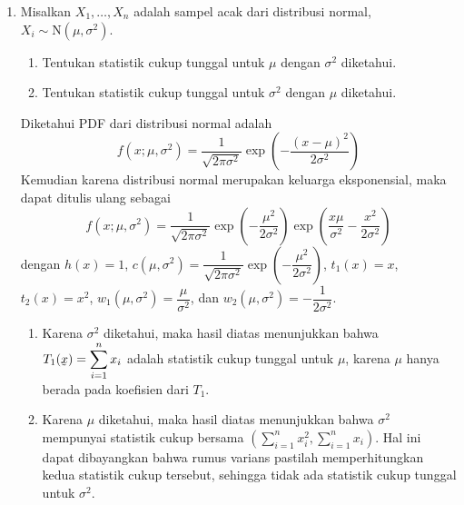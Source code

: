 \documentclass{exam}
\begin{document}
\begin{enumerate}
    \item Misalkan \(X_1, \dots, X_n\) adalah sampel acak dari distribusi normal, \(X_i \sim \text{N}(\mu, \sigma^2)\).
    \begin{enumerate}
        \item Tentukan statistik cukup tunggal untuk \(\mu\) dengan \(\sigma^2\) diketahui.
        \item Tentukan statistik cukup tunggal untuk \(\sigma^2\) dengan \(\mu\) diketahui.
    \end{enumerate}
    \begin{solution}
        Diketahui PDF dari distribusi normal adalah
        \begin{equation*}
            f(x;\mu,\sigma^2) = \frac{1}{\sqrt{2\pi\sigma^2}}\exp\left(-\frac{(x-\mu)^2}{2\sigma^2}\right)
        \end{equation*}
        Kemudian karena distribusi normal merupakan keluarga eksponensial, maka dapat ditulis ulang sebagai
        \begin{equation*}
            f(x;\mu,\sigma^2) = \frac{1}{\sqrt{2\pi\sigma^2}}\exp\left(-\frac{\mu^2}{2\sigma^2}\right)\exp\left(\frac{x\mu}{\sigma^2}-\frac{x^2}{2\sigma^2}\right)
        \end{equation*}
        dengan $h(x)=1$, $c(\mu,\sigma^2)=\dfrac{1}{\sqrt{2\pi\sigma^2}}\exp\left(-\dfrac{\mu^2}{2\sigma^2}\right)$, $t_1(x)=x$, $t_2(x)=x^2$, $w_1(\mu,\sigma^2)=\dfrac{\mu}{\sigma^2}$, dan $w_2(\mu,\sigma^2)=-\dfrac{1}{2\sigma^2}$.
        \begin{enumerate}
            \item Karena $\sigma^2$ diketahui, maka hasil diatas menunjukkan bahwa $\displaystyle T_1(\underaccent{\tilde}{x})=\sum_{i=1}^n x_i$ adalah statistik cukup tunggal untuk $\mu$, karena $\mu$ hanya berada pada koefisien dari $T_1$.
            \item Karena $\mu$ diketahui, maka hasil diatas menunjukkan bahwa $\sigma^2$ mempunyai statistik cukup bersama $\displaystyle\left(\sum_{i=1}^n x_i^2, \sum_{i=1}^n x_i\right)$. Hal ini dapat dibayangkan bahwa rumus varians pastilah memperhitungkan kedua statistik cukup tersebut, sehingga tidak ada statistik cukup tunggal untuk $\sigma^2$.  
        \end{enumerate}
    \end{solution}


\end{enumerate}
\end{document}
